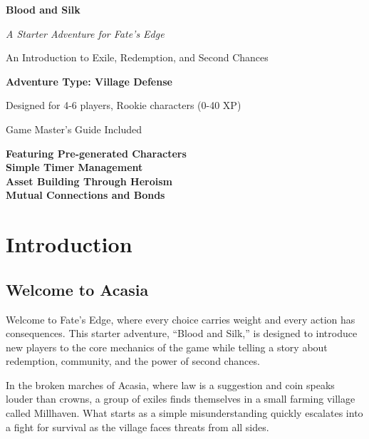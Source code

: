 \documentclass[11pt]{article}
\begin{document}
\begin{titlepage}
\centering
\vspace*{2cm}

{\Huge\bfseries\color{headercolor} Blood and Silk}

\vspace{0.5cm}

{\Large\itshape A Starter Adventure for Fate's Edge}

\vspace{1cm}

{\large An Introduction to Exile, Redemption, and Second Chances}

\vspace{1cm}

{\Large\bfseries Adventure Type: Village Defense}

\vspace{1cm}

{\large Designed for 4-6 players, Rookie characters (0-40 XP)}

\vspace{1cm}

{\large Game Master's Guide Included}

\vfill

{\large 
\textbf{Featuring Pre-generated Characters} \\
\textbf{Simple Timer Management} \\
\textbf{Asset Building Through Heroism} \\
\textbf{Mutual Connections and Bonds}
}

\end{titlepage}

\newpage

\section{Introduction}

\subsection{Welcome to Acasia}

Welcome to Fate's Edge, where every choice carries weight and every action has consequences. This starter adventure, ``Blood and Silk,'' is designed to introduce new players to the core mechanics of the game while telling a story about redemption, community, and the power of second chances.

In the broken marches of Acasia, where law is a suggestion and coin speaks louder than crowns, a group of exiles finds themselves in a small farming village called Millhaven. What starts as a simple misunderstanding quickly escalates into a fight for survival as the village faces threats from all sides.
\end{document}
